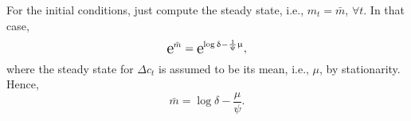 For the initial conditions, just compute the steady state, i.e., $m_t = \bar{m}$, $\forall t$. In that case,
$$
	\e{\bar{m}} = \e{\log\delta - \frac{1}{\psi}\mu},
$$
where the steady state for $\Delta c_t$ is assumed to be its mean, i.e., $\mu$, by stationarity. Hence,
\begin{equation}
	\bar{m} = \log \delta - \frac{\mu}{\psi}.
\end{equation}
%
%
